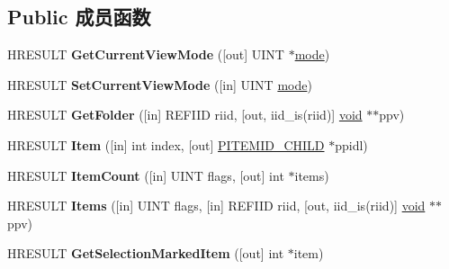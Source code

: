 \subsection*{Public 成员函数}
\begin{DoxyCompactItemize}
\item 
\mbox{\label{interface_i_folder_view_ab77206bd0ce02559d223a5f539c9a1dc}} 
H\+R\+E\+S\+U\+LT {\bfseries Get\+Current\+View\+Mode} (\mbox{[}out\mbox{]} U\+I\+NT $\ast$\hyperlink{interfacevoid}{mode})
\item 
\mbox{\label{interface_i_folder_view_a59c4cc0b193bc3710710a7ff4b4052b4}} 
H\+R\+E\+S\+U\+LT {\bfseries Set\+Current\+View\+Mode} (\mbox{[}in\mbox{]} U\+I\+NT \hyperlink{interfacevoid}{mode})
\item 
\mbox{\label{interface_i_folder_view_a79cdd157113a4f7779568bd68a69ec6a}} 
H\+R\+E\+S\+U\+LT {\bfseries Get\+Folder} (\mbox{[}in\mbox{]} R\+E\+F\+I\+ID riid, \mbox{[}out, iid\+\_\+is(riid)\mbox{]} \hyperlink{interfacevoid}{void} $\ast$$\ast$ppv)
\item 
\mbox{\label{interface_i_folder_view_a1af86666f0f6226ef58253bc44ad1fb1}} 
H\+R\+E\+S\+U\+LT {\bfseries Item} (\mbox{[}in\mbox{]} int index, \mbox{[}out\mbox{]} \hyperlink{struct___i_t_e_m_i_d___c_h_i_l_d}{P\+I\+T\+E\+M\+I\+D\+\_\+\+C\+H\+I\+LD} $\ast$ppidl)
\item 
\mbox{\label{interface_i_folder_view_a04582a6fa5c884a531f0712211cd0852}} 
H\+R\+E\+S\+U\+LT {\bfseries Item\+Count} (\mbox{[}in\mbox{]} U\+I\+NT flags, \mbox{[}out\mbox{]} int $\ast$items)
\item 
\mbox{\label{interface_i_folder_view_ad22e3a8458582746abaf3e3dbdb0f4bd}} 
H\+R\+E\+S\+U\+LT {\bfseries Items} (\mbox{[}in\mbox{]} U\+I\+NT flags, \mbox{[}in\mbox{]} R\+E\+F\+I\+ID riid, \mbox{[}out, iid\+\_\+is(riid)\mbox{]} \hyperlink{interfacevoid}{void} $\ast$$\ast$ppv)
\item 
\mbox{\label{interface_i_folder_view_a72d252a42b107f6b0ca117476a0dadab}} 
H\+R\+E\+S\+U\+LT {\bfseries Get\+Selection\+Marked\+Item} (\mbox{[}out\mbox{]} int $\ast$item)

\end{DoxyCompactItemize}
